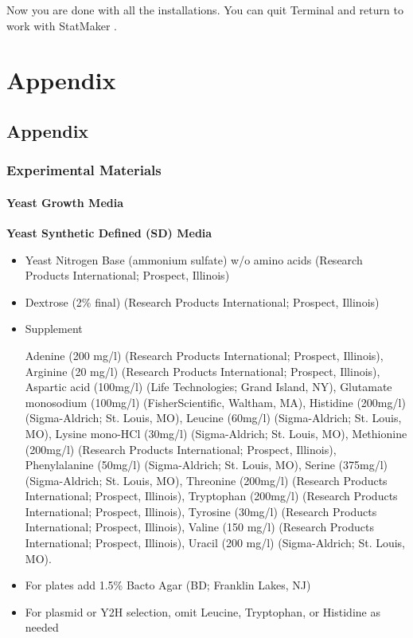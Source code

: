 \documentclass[11pt,fleqn]{book} %
\newcommand{\StatMaker}{{\color{Dandelion} StatMaker }}
\begin{document}
Now you are done with all the installations.  You can quit Terminal and return to work with \StatMaker.

\cleardoublepage


\part{Appendix}



\chapter{Appendix}

\section{Experimental Materials}

\subsection{Yeast Growth Media}

\textbf{Yeast Synthetic Defined (SD) Media}

\begin{itemize}
    \item Yeast Nitrogen Base (ammonium sulfate) w/o amino acids (Research Products International; Prospect, Illinois)
    \item Dextrose (2\% final) (Research Products International; Prospect, Illinois)
    \item Supplement

    Adenine (200 mg/l) (Research Products International; Prospect, Illinois), Arginine (20 mg/l) (Research Products International; Prospect, Illinois), Aspartic acid (100mg/l) (Life Technologies; Grand Island, NY), Glutamate monosodium (100mg/l) (FisherScientific, Waltham, MA), Histidine (200mg/l) (Sigma-Aldrich; St. Louis, MO), Leucine (60mg/l) (Sigma-Aldrich; St. Louis, MO), Lysine mono-HCl (30mg/l) (Sigma-Aldrich; St. Louis, MO), Methionine (200mg/l) (Research Products International; Prospect, Illinois), Phenylalanine (50mg/l) (Sigma-Aldrich; St. Louis, MO), Serine (375mg/l) (Sigma-Aldrich; St. Louis, MO), Threonine (200mg/l) (Research Products International; Prospect, Illinois), Tryptophan (200mg/l) (Research Products International; Prospect, Illinois), Tyrosine (30mg/l) (Research Products International; Prospect, Illinois), Valine (150 mg/l) (Research Products International; Prospect, Illinois), Uracil (200 mg/l) (Sigma-Aldrich; St. Louis, MO).  

    \item For plates add 1.5\% Bacto Agar (BD; Franklin Lakes, NJ)
    \item For plasmid or Y2H selection, omit Leucine, Tryptophan, or Histidine as needed
\end{itemize}
\end{document}
